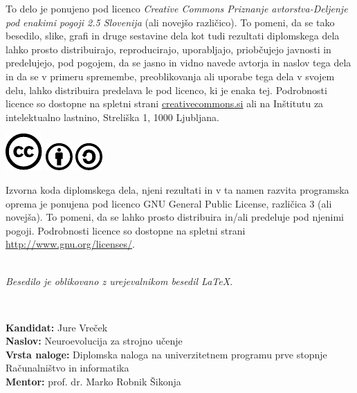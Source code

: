 \documentclass[a4paper,12pt,openright]{book}
\newcommand{\clearemptydoublepage}{\newpage{\pagestyle{empty}\cleardoublepage}}
\newcommand{\CcImageCc}[1]{%
    \includegraphics[scale=#1]{cc_cc_30.pdf}%
}
\newcommand{\CcImageBy}[1]{%
    \includegraphics[scale=#1]{cc_by_30.pdf}%
}
\newcommand{\CcImageSa}[1]{%
    \includegraphics[scale=#1]{cc_sa_30.pdf}%
}
\begin{document}
    \vspace*{5cm}
    {\small \noindent
    To delo je ponujeno pod licenco \textit{Creative Commons Priznanje avtorstva-Deljenje pod enakimi pogoji 2.5 Slovenija} (ali novej\v so razli\v cico).
    To pomeni, da se tako besedilo, slike, grafi in druge sestavine dela kot tudi rezultati diplomskega dela lahko prosto distribuirajo,
        reproducirajo, uporabljajo, priobčujejo javnosti in predelujejo, pod pogojem, da se jasno in vidno navede avtorja in naslov tega
    dela in da se v primeru spremembe, preoblikovanja ali uporabe tega dela v svojem delu, lahko distribuira predelava le pod
    licenco, ki je enaka tej.
    Podrobnosti licence so dostopne na spletni strani \href{http://creativecommons.si}{creativecommons.si} ali na Inštitutu za
    intelektualno lastnino, Streliška 1, 1000 Ljubljana.

    \vspace*{1cm}
        \begin{center}%
            \CcImageCc{0.741573033707865}\hspace*{1ex}\CcImageBy{1}\hspace*{1ex}\CcImageSa{1}%
        \end{center}
    }

    \vspace*{1cm}
    {\small \noindent
    Izvorna koda diplomskega dela, njeni rezultati in v ta namen razvita programska oprema je ponujena pod licenco GNU General Public License,
        različica 3 (ali novejša). To pomeni, da se lahko prosto distribuira in/ali predeluje pod njenimi pogoji.
    Podrobnosti licence so dostopne na spletni strani \url{http://www.gnu.org/licenses/}.
    }

    \vfill
    \begin{center}
        \ \\ \vfill
        {\em
        Besedilo je oblikovano z urejevalnikom besedil \LaTeX.}
    \end{center}

    \clearemptydoublepage

    \thispagestyle{empty}
    \
    \vfill

    \bigskip
    \noindent\textbf{Kandidat:} Jure Vreček\\
    \noindent\textbf{Naslov:} Neuroevolucija za strojno učenje\\
    \noindent\textbf{Vrsta naloge:} Diplomska naloga na univerzitetnem programu prve stopnje Računalništvo in informatika \\
    \noindent\textbf{Mentor:} prof. dr. Marko Robnik Šikonja\\
\end{document}
